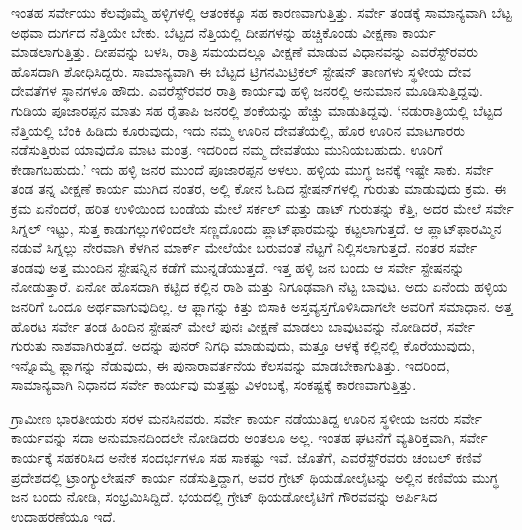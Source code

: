 ಇಂತಹ ಸರ್ವೇಯು ಕೆಲವೊಮ್ಮೆ ಹಳ್ಳಿಗಳಲ್ಲಿ ಆತಂಕಕ್ಕೂ ಸಹ ಕಾರಣವಾಗುತ್ತಿತ್ತು. ಸರ್ವೇ ತಂಡಕ್ಕೆ ಸಾಮಾನ್ಯವಾಗಿ ಬೆಟ್ಟ ಅಥವಾ ದುರ್ಗದ ನೆತ್ತಿಯೇ ಬೇಕು. ಬೆಟ್ಟದ ನೆತ್ತಿಯಲ್ಲಿ ದೀಪಗಳನ್ನು ಹಚ್ಚಿಕೊಂಡು ವೀಕ್ಷಣಾ ಕಾರ್ಯ ಮಾಡಲಾಗುತ್ತಿತ್ತು. ದೀಪವನ್ನು ಬಳಸಿ, ರಾತ್ರಿ ಸಮಯದಲ್ಲೂ ವೀಕ್ಷಣೆ ಮಾಡುವ ವಿಧಾನವನ್ನು ಎವರೆಸ್ಟ್​ರವರು ಹೊಸದಾಗಿ ಶೋಧಿಸಿದ್ದರು. ಸಾಮಾನ್ಯವಾಗಿ ಈ ಬೆಟ್ಟದ ಟ್ರಿಗನಮಿಟ್ರಿಕಲ್​ ಸ್ಟೇಷನ್​ ತಾಣಗಳು ಸ್ಥಳೀಯ ದೇವ ದೇವತೆಗಳ ಸ್ಥಾನಗಳೂ ಹೌದು. ಎವರೆಸ್ಟ್​ರವರ ರಾತ್ರಿ ಕಾರ್ಯವು ಹಳ್ಳಿ ಜನರಲ್ಲಿ ಅನುಮಾನ ಮೂಡಿಸುತ್ತಿದ್ದವು. ಗುಡಿಯ ಪೂಜಾರಪ್ಪನ ಮಾತು ಸಹ ರೈತಾಪಿ ಜನರಲ್ಲಿ ಶಂಕೆಯನ್ನು ಹೆಚ್ಚು ಮಾಡುತಿದ್ದವು. ‘ನಡುರಾತ್ರಿಯಲ್ಲಿ ಬೆಟ್ಟದ ನೆತ್ತಿಯಲ್ಲಿ ಬೆಂಕಿ ಹಿಡಿದು ಕೂರುವುದು, ಇದು ನಮ್ಮ ಊರಿನ ದೇವತೆಯಲ್ಲಿ, ಹೊರ ಊರಿನ ಮಾಟಗಾರರು ನಡೆಸುತ್ತಿರುವ ಯಾವುದೊ ಮಾಟ ಮಂತ್ರ. ಇದರಿಂದ ನಮ್ಮ ದೇವತೆಯು ಮುನಿಯಬಹುದು. ಊರಿಗೆ ಕೇಡಾಗಬಹುದು.’ ಇದು ಹಳ್ಳಿ ಜನರ ಮುಂದೆ ಪೂಜಾರಪ್ಪನ ಅಳಲು. ಹಳ್ಳಿಯ ಮುಗ್ಧ ಜನಕ್ಕೆ ಇಷ್ಟೇ ಸಾಕು. ಸರ್ವೇ ತಂಡ ತನ್ನ ವೀಕ್ಷಣೆ ಕಾರ್ಯ ಮುಗಿದ ನಂತರ, ಅಲ್ಲಿ ಕೋನ ಓದಿದ ಸ್ಟೇಷನ್​ಗಳಲ್ಲಿ ಗುರುತು ಮಾಡುವುದು ಕ್ರಮ. ಈ ಕ್ರಮ ಏನೆಂದರೆ, ಹರಿತ ಉಳಿಯಿಂದ ಬಂಡೆಯ ಮೇಲೆ ಸರ್ಕಲ್​ ಮತ್ತು ಡಾಟ್​ ಗುರುತನ್ನು ಕೆತ್ತಿ, ಅದರ ಮೇಲೆ ಸರ್ವೇ ಸಿಗ್ನಲ್​ ಇಟ್ಟು, ಸುತ್ತ ಕಾಡುಗಲ್ಲುಗಳಿಂದಲೇ ಸಣ್ಣದೊಂದು ಪ್ಲಾಟ್​ಫಾರಮನ್ನು ಕಟ್ಟಲಾಗುತ್ತದೆ. ಆ ಪ್ಲಾಟ್​ಫಾರಮ್ಮಿನ ನಡುವೆ ಸಿಗ್ನಲ್ಲು ನೇರವಾಗಿ ಕೆಳಗಿನ ಮಾರ್ಕ್ ಮೇಲೆಯೇ ಬರುವಂತೆ ನೆಟ್ಟಗೆ ನಿಲ್ಲಿಸಲಾಗುತ್ತದೆ. ನಂತರ ಸರ್ವೇ ತಂಡವು ಅತ್ತ ಮುಂದಿನ ಸ್ಟೇಷನ್ನಿನ ಕಡೆಗೆ ಮುನ್ನಡೆಯುತ್ತದೆ. ಇತ್ತ ಹಳ್ಳಿ ಜನ ಬಂದು ಆ ಸರ್ವೇ ಸ್ಟೇಷನನ್ನು ನೋಡುತ್ತಾರೆ. ಏನೋ ಹೊಸದಾಗಿ ಕಟ್ಟಿದ ಕಲ್ಲಿನ ರಾಶಿ ಮತ್ತು ನಿಗೂಢವಾಗಿ ನೆಟ್ಟ ಬಾವುಟ. ಅದು ಏನೆಂದು ಹಳ್ಳಿಯ ಜನರಿಗೆ ಒಂದೂ ಅರ್ಥವಾಗುವುದಿಲ್ಲ. ಆ ಫ್ಲಾಗನ್ನು ಕಿತ್ತು ಬಿಸಾಕಿ ಅಸ್ತವ್ಯಸ್ತಗೊಳಿಸಿದಾಗಲೇ ಅವರಿಗೆ ಸಮಾಧಾನ. ಅತ್ತ ಹೊರಟ ಸರ್ವೇ ತಂಡ ಹಿಂದಿನ ಸ್ಟೇಷನ್​ ಮೇಲೆ ಪುನಃ ವೀಕ್ಷಣೆ ಮಾಡಲು ಬಾವುಟವನ್ನು ನೋಡಿದರೆ, ಸರ್ವೇ ಗುರುತು ನಾಶವಾಗಿರುತ್ತದೆ. ಅದನ್ನು ಪುನರ್​ ನಿಗಧಿ ಮಾಡುವುದು, ಮತ್ತೂ ಆಳಕ್ಕೆ ಕಲ್ಲಿನಲ್ಲಿ ಕೊರೆಯುವುದು, ಇನ್ನೊಮ್ಮೆ ಫ್ಲಾಗನ್ನು ನೆಡುವುದು, ಈ ಪುನಾರಾವರ್ತನೆಯ ಕೆಲಸವನ್ನು ಮಾಡಬೇಕಾಗುತಿತ್ತು. ಇದರಿಂದ, ಸಾಮಾನ್ಯವಾಗಿ ನಿಧಾನದ ಸರ್ವೇ ಕಾರ್ಯವು ಮತ್ತಷ್ಟು ವಿಳಂಬಕ್ಕೆ, ಸಂಕಷ್ಟಕ್ಕೆ ಕಾರಣವಾಗುತ್ತಿತ್ತು.

ಗ್ರಾಮೀಣ ಭಾರತೀಯರು ಸರಳ ಮನಸಿನವರು. ಸರ್ವೇ ಕಾರ್ಯ ನಡೆಯುತಿದ್ದ ಊರಿನ ಸ್ಥಳೀಯ ಜನರು ಸರ್ವೇ ಕಾರ್ಯವನ್ನು ಸದಾ ಅನುಮಾನದಿಂದಲೇ ನೋಡಿದರು ಅಂತಲೂ ಅಲ್ಲ. ಇಂತಹ ಘಟನೆಗೆ ವ್ಯತಿರಿಕ್ತವಾಗಿ, ಸರ್ವೇ ಕಾರ್ಯಕ್ಕೆ ಸಹಕರಿಸಿದ ಅನೇಕ ಸಂದರ್ಭಗಳೂ ಸಹ ಸಾಕಷ್ಟು ಇವೆ. ಜೊತೆಗೆ, ಎವರೆಸ್ಟ್​ರವರು ಚಂಬಲ್​ ಕಣಿವೆ ಪ್ರದೇಶದಲ್ಲಿ ಟ್ರಾಂಗ್ಯುಲೇಷನ್​ ಕಾರ್ಯ ನಡೆಸುತ್ತಿದ್ದಾಗ, ಅವರ ಗ್ರೇಟ್​ ಥಿಯಡೋಲೈಟನ್ನು ಅಲ್ಲಿನ ಕಣಿವೆಯ ಮುಗ್ಧ ಜನ ಬಂದು ನೋಡಿ, ಸಂಭ್ರಮಿಸಿದ್ದಿದೆ. ಭಯದಲ್ಲಿ ಗ್ರೇಟ್​ ಥಿಯಡೋಲೈಟಿಗೆ ಗೌರವವನ್ನು ಅರ್ಪಿಸಿದ ಉದಾಹರಣೆಯೂ ಇದೆ.

